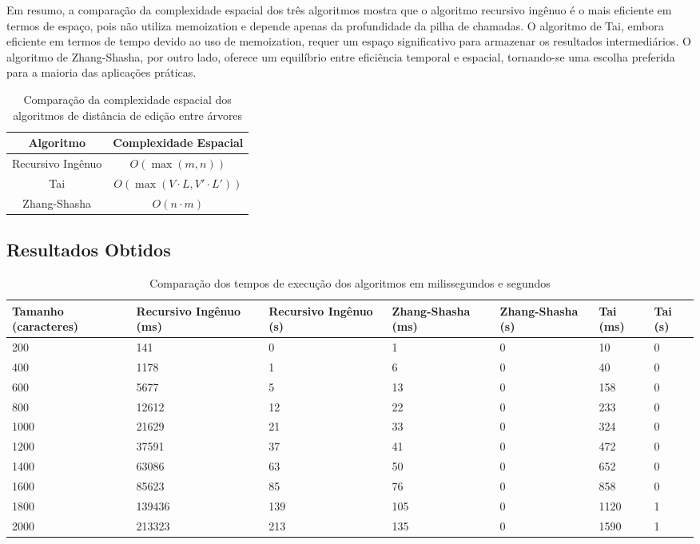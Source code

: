 \documentclass[12pt]{article}
\begin{document}
Em resumo, a comparação da complexidade espacial dos três algoritmos mostra que o algoritmo recursivo ingênuo é o mais eficiente em termos de espaço, pois não utiliza memoization e depende apenas da profundidade da pilha de chamadas. O algoritmo de Tai, embora eficiente em termos de tempo devido ao uso de memoization, requer um espaço significativo para armazenar os resultados intermediários. O algoritmo de Zhang-Shasha, por outro lado, oferece um equilíbrio entre eficiência temporal e espacial, tornando-se uma escolha preferida para a maioria das aplicações práticas.
\begin{table}[h]
\centering
\begin{tabular}{|c|c|}
\hline
\textbf{Algoritmo} & \textbf{Complexidade Espacial} \\ \hline
Recursivo Ingênuo & \(O(\max(m, n))\) \\ \hline
Tai & \(O(\max(V \cdot L, V' \cdot L'))\) \\ \hline
Zhang-Shasha & \(O(n \cdot m)\) \\ \hline
\end{tabular}
\caption{Comparação da complexidade espacial dos algoritmos de distância de edição entre árvores}
\label{tab:complexidade_espacial}
\end{table}
\newpage
\subsection{Resultados Obtidos}
\begin{table}[htbp]
\centering
\begin{tabularx}{\textwidth}{|X|X|X|X|X|X|X|}
\hline
\textbf{Tamanho (caracteres)} & \textbf{Recursivo Ingênuo (ms)} & \textbf{Recursivo Ingênuo (s)} & \textbf{Zhang-Shasha (ms)} & \textbf{Zhang-Shasha (s)} & \textbf{Tai (ms)} & \textbf{Tai (s)} \\ \hline
200  & 141 & 0 & 1 & 0 & 10 & 0 \\ \hline
400  & 1178 & 1 & 6 & 0 & 40 & 0 \\ \hline
600  & 5677 & 5 & 13 & 0 & 158 & 0 \\ \hline
800  & 12612 & 12 & 22 & 0 & 233 & 0 \\ \hline
1000 & 21629 & 21 & 33 & 0 & 324 & 0 \\ \hline
1200 & 37591 & 37 & 41 & 0 & 472 & 0 \\ \hline
1400 & 63086 & 63 & 50 & 0 & 652 & 0 \\ \hline
1600 & 85623 & 85 & 76 & 0 & 858 & 0 \\ \hline
1800 & 139436 & 139 & 105 & 0 & 1120 & 1 \\ \hline
2000 & 213323 & 213 & 135 & 0 & 1590 & 1 \\ \hline
\end{tabularx}
\caption{Comparação dos tempos de execução dos algoritmos em milissegundos e segundos}
\label{tab:resultados}
\end{table}
\end{document}
